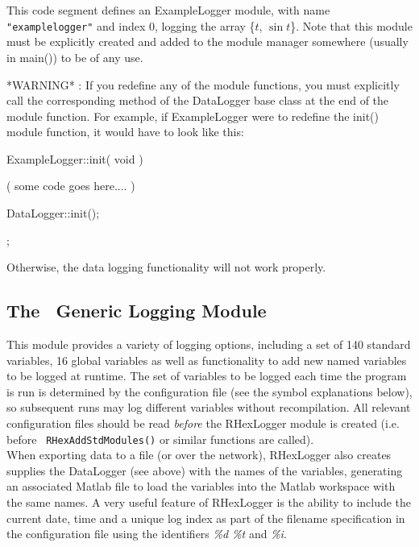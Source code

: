 This code segment defines an ExampleLogger module, with name {\tt
"examplelogger"} and index 0, logging the array \{$t$, $\sin t$\}. Note that
this module must be explicitly created and added to the module manager
somewhere (usually in main()) to be of any use.

*WARNING* : If you redefine any of the module functions, you must explicitly
call the corresponding method of the DataLogger base class at the end of the
module function. For example, if ExampleLogger were to redefine the init()
module function, it would have to look like this:

\begin{codesegment}
ExampleLogger::init( void ) {

  ( some code goes here.... )

  DataLogger::init();
};
\end{codesegment}

Otherwise, the data logging functionality will not work properly.

\subsection{The \RHexLogger\ Generic Logging Module}

\begin{moduleheader}
\classname{\RHexLogger} \mline
\modulebase{\Module} \mline
{}
\usedmodules{\DataLogger}
\end{moduleheader}

This module provides a variety of logging options, including a set of 140
standard variables, 16 global variables as well as functionality to add new
named variables to be logged at runtime. The set of variables to be logged
each time the program is run is determined by the configuration file (see
the symbol explanations below), so subsequent runs may log different
variables without recompilation. All relevant configuration files should be
read {\em before} the RHexLogger module is created (i.e. before {\tt
RHexAddStdModules()} or similar functions are called).\\

When exporting data to a file (or over the network), RHexLogger also creates
supplies the DataLogger (see above) with the names of the variables,
generating an associated Matlab file to load the variables into the Matlab
workspace with the same names. A very useful feature of RHexLogger is the
ability to include the current date, time and a unique log index as part of
the filename specification in the configuration file using the identifiers
{\em \%d \%t} and {\em \%i}.

